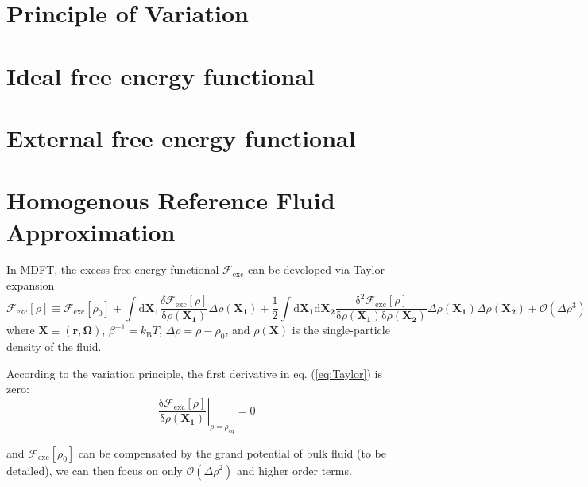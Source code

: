 \section{Principle of Variation}


\section{Ideal free energy functional}


\section{External free energy functional}


\section{Homogenous Reference Fluid Approximation}

In MDFT, the excess free
energy functional $\mathcal{F}_{\mathrm{exc}}$ can be developed via
Taylor expansion 
\begin{equation}
\mathcal{F}_{\mathrm{exc}}\left[\rho\right]\equiv\mathcal{F}_{\mathrm{exc}}\left[\rho_{0}\right]+\int\mathrm{d}\mathbf{X_{1}}\frac{\delta\mathcal{F}_{\mathrm{exc}}\left[\rho\right]}{\mathrm{\delta}\rho(\mathbf{X_{1}})}\Delta\rho(\mathbf{X_{1}})+\frac{1}{2}\int\mathrm{d}\mathbf{X_{1}}\mathrm{d}\mathbf{X_{2}}\frac{\mathrm{\delta}^{2}\mathcal{F}_{\mathrm{exc}}\left[\rho\right]}{\mathrm{\delta}\rho(\mathbf{X_{1}})\mathrm{\delta}\rho(\mathbf{X_{2}})}\Delta\rho(\mathbf{X_{1}})\Delta\rho(\mathbf{X_{2}})+\mathcal{O}(\Delta\rho^{3})\label{eq:Taylor}
\end{equation}
where $\mathbf{X}\equiv(\mathbf{r},\mathbf{\Omega})$, $\beta^{-1}=k_{\mathrm{B}}T$,
$\Delta\rho=\rho-\rho_{0}$, and $\rho(\mathbf{X})$ is the single-particle
density of the fluid.

According to the variation principle, the first derivative in eq.
(\ref{eq:Taylor}) is zero:
\begin{equation}
\left.\frac{\mathrm{\delta}\mathcal{F}_{\mathrm{exc}}\left[\rho\right]}{\mathrm{\delta}\rho(\mathbf{X_{1}})}\right|_{\rho=\rho_{\mathrm{eq}}}=0
\end{equation}


and $\mathcal{F}_{\mathrm{exc}}\left[\rho_{0}\right]$ can be compensated
by the grand potential of bulk fluid (to be detailed), we can then
focus on only $\mathcal{O}(\Delta\rho^{2})$ and higher order terms.

